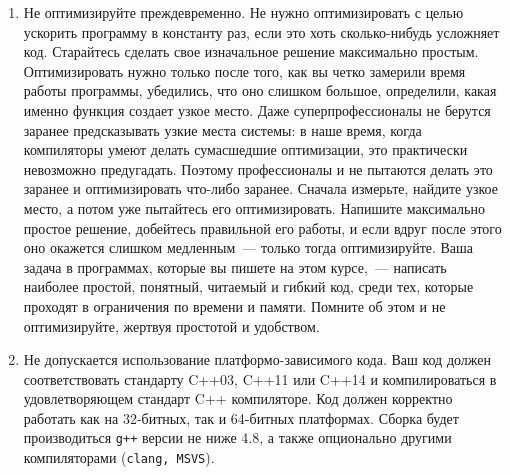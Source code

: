 \documentclass[a4paper,10pt]{article}
\begin{document}
\begin{enumerate}
    \item Не оптимизируйте преждевременно.  Не нужно оптимизировать с целью
        ускорить программу в константу раз, если это хоть сколько-нибудь
        усложняет код. Старайтесь сделать свое изначальное решение максимально
        простым. Оптимизировать нужно только после того, как вы четко замерили
        время работы программы, убедились, что оно слишком большое, определили,
        какая именно функция создает узкое место. Даже суперпрофессионалы не
        берутся заранее предсказывать узкие места системы: в наше время, когда
        компиляторы умеют делать сумасшедшие оптимизации, это практически
        невозможно предугадать.  Поэтому профессионалы и не пытаются делать это
        заранее и оптимизировать что-либо заранее. Сначала измерьте, найдите
        узкое место, а потом уже пытайтесь его оптимизировать. Напишите
        максимально простое решение, добейтесь правильной его работы, и если
        вдруг после этого оно окажется слишком медленным~— только тогда
        оптимизируйте. Ваша задача в программах, которые вы пишете на этом
        курсе,~— написать наиболее простой, понятный, читаемый и гибкий код,
        среди тех, которые проходят в ограничения по времени и памяти. Помните
        об этом и не оптимизируйте, жертвуя простотой и удобством.
    \item Не допускается использование платформо-зависимого кода.
          Ваш код должен соответствовать стандарту C++03, C++11 или C++14 и компилироваться в удовлетворяющем стандарт C++ компиляторе.
          Код должен корректно работать как на 32-битных, так и 64-битных платформах.
          Сборка будет производиться {\tt g++} версии не ниже 4.8, а также опционально другими компиляторами ({\tt clang, MSVS}).
\end{enumerate}
\end{document}
